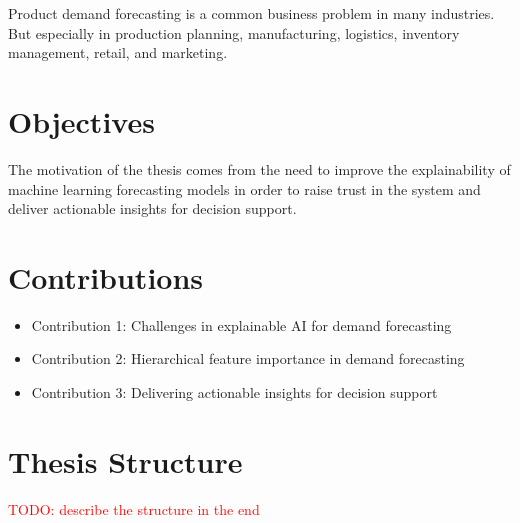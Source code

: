 

Product demand forecasting is a common business problem in many industries.
But especially in production planning, manufacturing, logistics, inventory management, retail, and marketing.


\section[Objectives]{Objectives}



The motivation of the thesis comes from the need to improve the explainability of machine learning forecasting models in order to raise trust in the system and deliver actionable insights for decision support.



\section[Contributions]{Contributions}

\begin{itemize}
    \item Contribution 1: Challenges in explainable AI for demand forecasting
    \item Contribution 2: Hierarchical feature importance in demand forecasting
    \item Contribution 3: Delivering actionable insights for decision support
\end{itemize}






\section[Thesis Structure]{Thesis Structure}
\textcolor{red}{TODO: describe the structure in the end}


